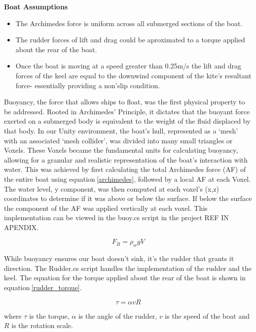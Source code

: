 \textbf{Boat Assumptions}
\begin{itemize}
    \item The Archimedes force is uniform across all submerged sections of the boat.
    \item The rudder forces of lift and drag could be aproximated to a torque applied about the rear of the boat.
    \item Once the boat is moving at a speed greater than 0.25m/s the lift and drag forces of the keel are equal to the downwind component of the kite's resultant force- essentially providing a non'slip condition.
\end{itemize}
Buoyancy, the force that allows ships to float, was the first physical property to be addressed. Rooted in Archimedes' Principle, it dictates that the buoyant force exerted on a submerged body is equivalent to the weight of the fluid displaced by that body. In our Unity environment, the boat's hull, represented as a `mesh' with an associated `mesh collider', was divided into many small triangles or Voxels. These Voxels became the fundamental units for calculating buoyancy, allowing for a granular and realistic representation of the boat's interaction with water. This was achieved by first calculating the total Archimedes force (AF) of the entire boat using equation$~$\ref{archimedes}, followed by a local AF at each Voxel. The water level, y component, was then computed at each voxel's (x,z) coordinates to determine if it was above or below the surface. If below the surface the component of the AF was applied vertically at each voxel. This implementation can be viewed in the buoy.cs script in the project REF IN APENDIX.

\begin{equation}
    F_B = \rho_{w}gV
    \label{archimedes}
\end{equation}

While buoyancy ensures our boat doesn't sink, it's the rudder that grants it direction. The Rudder.cs script handles the implementation of the rudder and the keel. The equation for the torque applied about the rear of the boat is shown in equation$~$\ref{rudder_torque}. 

\begin{equation}
    \tau = \alpha v R
    \label{rudder_torque}
\end{equation}

where $\tau$ is the torque, $\alpha$ is the angle of the rudder, $v$ is the speed of the boat and $R$ is the rotation scale.


